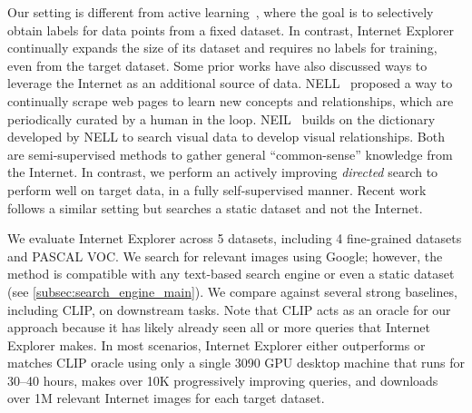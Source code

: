 Our setting is different from active learning~\cite{settles2009active}, where the goal is to selectively obtain labels for data points from a fixed dataset. In contrast, Internet Explorer continually expands the size of its dataset and requires no labels for training, even from the target dataset.
Some prior works have also discussed ways to leverage the Internet as an additional source of data. NELL~\cite{carlson2010toward} proposed a way to continually scrape web pages to learn new concepts and relationships, which are periodically curated by a human in the loop. NEIL~\cite{chen2013neil} builds on the dictionary developed by NELL to search visual data to develop visual relationships. Both are semi-supervised methods to gather general ``common-sense'' knowledge from the Internet. In contrast, we perform an actively improving \textit{directed} search to perform well on target data, in a fully self-supervised manner. Recent work~\cite{jiang2021improving} follows a similar setting but searches a static dataset and not the Internet.

We evaluate Internet Explorer across 5 datasets, including 4 fine-grained datasets and PASCAL VOC.
We search for relevant images using Google; however, the method is compatible with any text-based search engine or even a static dataset (see \cref{subsec:search_engine_main}).
We compare against several strong baselines, including CLIP, on downstream tasks. Note that CLIP acts as an oracle for our approach because it has likely already seen all or more queries that Internet Explorer makes.
In most scenarios, Internet Explorer either outperforms or matches CLIP oracle using only a single 3090 GPU desktop machine that runs for 30--40 hours, makes over 10K progressively improving queries, and downloads over 1M relevant Internet images for each target dataset.


